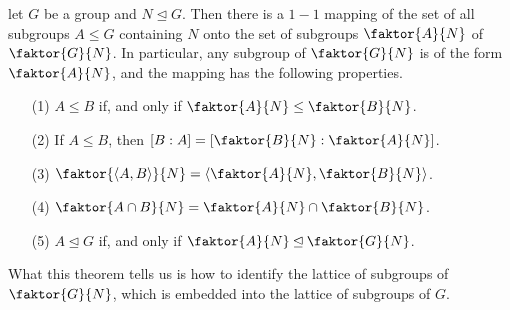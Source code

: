 \begin{theorem}\label{theorem_3.4.2}
  let $G$ be a group and  $N \unlhd G$. Then there is a  $1-1$ mapping of the
  set of all subgroups  $A \leq G$ containing $N$ onto the set of subgroups
  $\faktor{A}{N}$ of $\faktor{G}{N}$. In particular, any subgroup of
  $\faktor{G}{N}$ is of the form $\faktor{A}{N}$, and the mapping has the
  following properties.
  \begin{enumerate}
    \item[(1)] $A \leq B$ if, and only if  $\faktor{A}{N} \leq \faktor{B}{N}$.

    \item[(2)] If $A \leq B$, then  $[B:A]=[\faktor{B}{N} : \faktor{A}{N}]$.

    \item[(3)] $\faktor{\vbrack{A,B}}{N}=\vbrack{\faktor{A}{N},
      \faktor{B}{N}}$.

    \item[(4)] $\faktor{A \cap B}{N}=\faktor{A}{N} \cap \faktor{B}{N}$.

    \item[(5)] $A \unlhd G$ if, and only if  $\faktor{A}{N} \unlhd
      \faktor{G}{N}$.
  \end{enumerate}
\end{theorem}
\begin{remark}
  What this theorem tells us is how to identify the lattice of subgroups of
  $\faktor{G}{N}$, which is embedded into the lattice of subgroups of $G$.
\end{remark}

